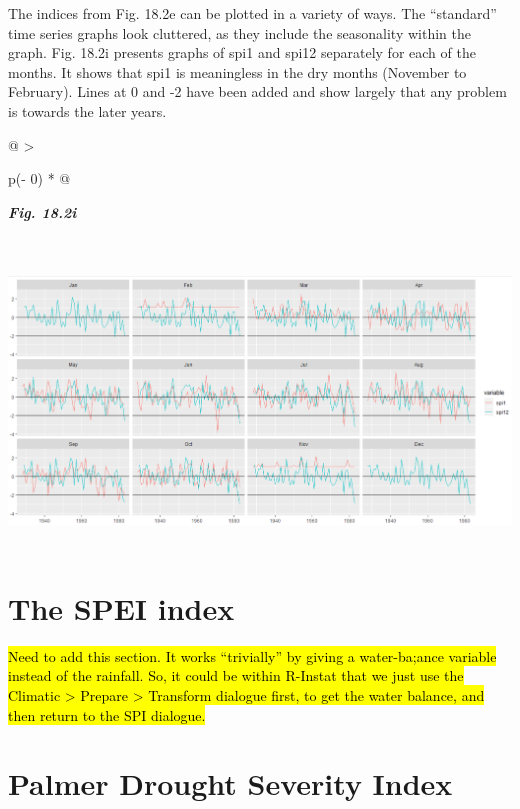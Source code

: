 \documentclass[
  letterpaper,
  DIV=11,
  numbers=noendperiod]{scrreprt}
\begin{document}
The indices from Fig. 18.2e can be plotted in a variety of ways. The
``standard'' time series graphs look cluttered, as they include the
seasonality within the graph. Fig. 18.2i presents graphs of spi1 and
spi12 separately for each of the months. It shows that spi1 is
meaningless in the dry months (November to February). Lines at 0 and -2
have been added and show largely that any problem is towards the later
years.

\begin{longtable}[]{@{}
  >{\raggedright\arraybackslash}p{(\columnwidth - 0\tabcolsep) * }@{}}
\toprule\noalign{}
\begin{minipage}[b]{\linewidth}\raggedright
\textbf{\emph{Fig. 18.2i}}
\end{minipage} \\
\midrule\noalign{}
\endhead
\bottomrule\noalign{}
\endlastfoot
\includegraphics[width=6.11366in,height=3.0128in]{figures/Fig18.2i.png} \\
\end{longtable}

\section{The SPEI index}\label{the-spei-index}

\hl{Need to add this section. It works ``trivially'' by giving a
water-ba;ance variable instead of the rainfall. So, it could be within
R-Instat that we just use the Climatic \textgreater{} Prepare
\textgreater{} Transform dialogue first, to get the water balance, and
then return to the SPI dialogue.}

\section{Palmer Drought Severity
Index}\label{palmer-drought-severity-index}
\end{document}
